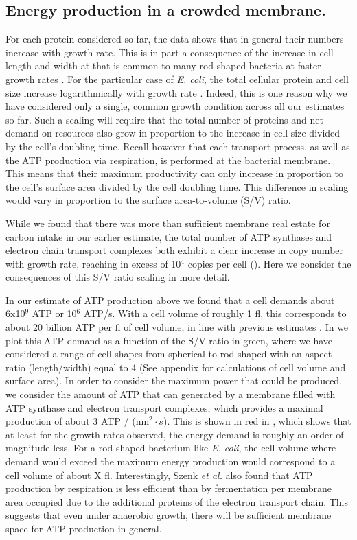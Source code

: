 \subsection{Energy production in a crowded membrane.}

For each protein considered so far, the data shows that in general their numbers
increase with growth rate. This is in part a consequence of the increase in cell
length and width at that is common to many rod-shaped bacteria at faster growth
rates \citep{ojkic2019, harris2018}. For the particular case of \textit{E.
coli}, the total cellular protein and cell size increase logarithmically with
growth rate \citep{schaechter1958, si2017}. Indeed, this is one reason why we
have considered only a single, common growth condition across all our estimates
so far. Such a scaling will require that the total number of proteins and net
demand on resources also grow in proportion to the increase in cell size divided
by the cell's doubling time. Recall however that each transport process, as well
as the ATP production via respiration, is performed at the bacterial membrane.
This means that their maximum productivity can only increase in proportion to
the cell's surface area divided by the cell doubling time. This difference in
scaling would vary in proportion to the surface area-to-volume (S/V) ratio.

While we found that there was more than sufficient membrane real estate for
carbon intake in our earlier estimate, the total number of ATP synthases and
electron chain transport complexes both exhibit a clear increase in copy number
with growth rate, reaching in excess of 10$^4$ copies per cell
(). Here we consider the consequences of this
S/V ratio scaling in more detail.

In our estimate of ATP production above we found that a cell demands about
6x10$^9$ ATP or 10$^6$ ATP/s. With a cell volume of roughly 1 fl, this
corresponds to about 20 billion ATP per fl of cell volume, in line  with
previous estimates \citep{stouthamer1977, szenk2017}. In 
we plot this ATP demand as a function of the S/V ratio in green, where we have
considered a range of cell shapes from spherical to rod-shaped with an aspect
ratio (length/width) equal to 4 (See appendix for calculations of cell volume
and surface area).  In order to consider the maximum power that could be
produced, we consider the amount of ATP that can generated by a membrane filled
with ATP synthase and electron transport complexes, which provides a maximal
production of about 3 ATP / (nm$^2 \cdot s$). This is shown in red in
, which shows that at least for the growth rates
observed, the energy demand is roughly an order of magnitude less.  For a
rod-shaped bacterium like \textit{E. coli}, the cell volume where demand would
exceed the maximum energy production would correspond to a cell volume of about
X fl. Interestingly, Szenk \textit{et al.} also found that ATP production by
respiration is less efficient than by fermentation per membrane area occupied
due to the additional proteins of the electron transport chain. This suggests
that even under anaerobic growth, there will be sufficient membrane space for
ATP production in general.


